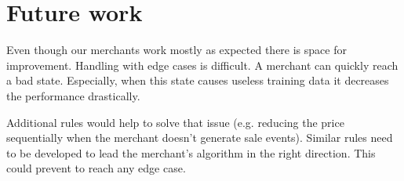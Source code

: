 \section{Future work}
\label{sec:future_work}

Even though our merchants work mostly as expected there is space for improvement. Handling with edge cases is difficult. A merchant can quickly reach a bad state. Especially, when this state causes useless training data it decreases the performance drastically.

Additional rules would help to solve that issue (e.g. reducing the price sequentially when the merchant doesn't generate sale events). Similar rules need to be developed to lead the merchant's algorithm in the right direction. This could prevent to reach any edge case.

